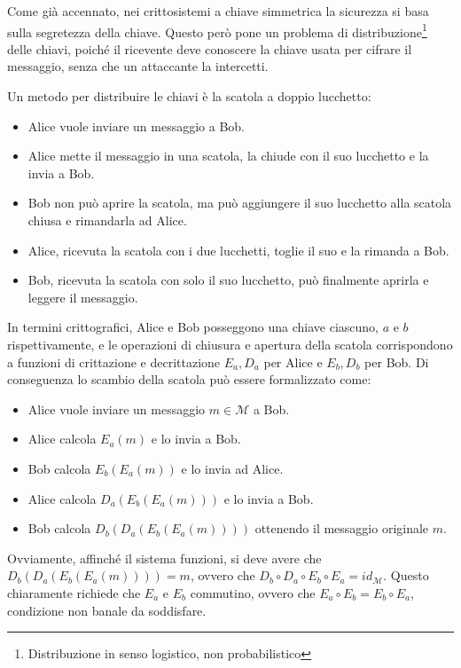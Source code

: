 Come già accennato, nei crittosistemi a chiave simmetrica la sicurezza si basa sulla segretezza della chiave.
Questo però pone un problema di distribuzione\footnote{Distribuzione in senso logistico, non probabilistico} delle chiavi, poiché il ricevente deve conoscere la chiave usata per cifrare il messaggio, senza che un attaccante la intercetti.

Un metodo  per distribuire le chiavi è la scatola a doppio lucchetto:
\begin{itemize}
  \item Alice vuole inviare un messaggio a Bob.
  \item Alice mette il messaggio in una scatola, la chiude con il suo lucchetto e la invia a Bob.
  \item Bob non può aprire la scatola, ma può aggiungere il suo lucchetto alla scatola chiusa e rimandarla ad Alice.
  \item Alice, ricevuta la scatola con i due lucchetti, toglie il suo e la rimanda a Bob.
  \item Bob, ricevuta la scatola con solo il suo lucchetto, può finalmente aprirla e leggere il messaggio.
\end{itemize}

In termini crittografici, Alice e Bob posseggono una chiave ciascuno, \(a\) e \(b\) rispettivamente, e le operazioni di chiusura e apertura della scatola corrispondono a funzioni di crittazione e decrittazione \(E_a, D_a\) per Alice e \(E_b, D_b\) per Bob.
Di conseguenza lo scambio della scatola può essere formalizzato come:

\begin{itemize}
  \item Alice vuole inviare un messaggio \(m \in \mathcal{M}\) a Bob.
  \item Alice calcola \(E_a(m)\) e lo invia a Bob.
  \item Bob calcola \(E_b(E_a(m))\) e lo invia ad Alice.
  \item Alice calcola \(D_a(E_b(E_a(m)))\) e lo invia a Bob.
  \item Bob calcola \(D_b(D_a(E_b(E_a(m))))\) ottenendo il messaggio originale \(m\).
\end{itemize}

Ovviamente, affinché il sistema funzioni, si deve avere che \(D_b(D_a(E_b(E_a(m)))) = m\), ovvero che \(D_b \circ D_a \circ E_b \circ E_a = id_{\mathcal{M}}\).
Questo chiaramente richiede che \(E_a\) e \(E_b\) commutino, ovvero che \(E_a \circ E_b = E_b \circ E_a\), condizione non banale da soddisfare.

